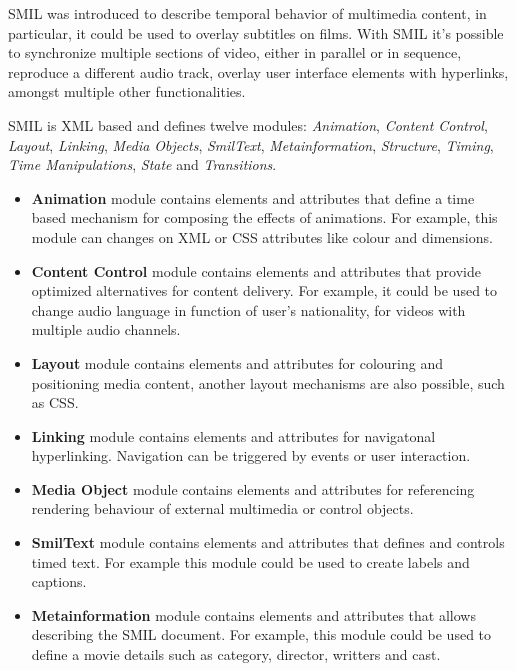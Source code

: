   \ac{SMIL}\cite{smil} was introduced to describe temporal behavior of multimedia content, in particular, it could be used to overlay subtitles on films. With \ac{SMIL} it's possible to synchronize multiple sections of video, either in parallel or in sequence, reproduce a different audio track, overlay user interface elements with hyperlinks, amongst multiple other functionalities.

  \ac{SMIL} is \ac{XML} based and defines twelve modules: \textit{Animation}, \textit{Content Control}, \textit{Layout}, \textit{Linking}, \textit{Media Objects}, \textit{SmilText}, \textit{Metainformation}, \textit{Structure}, \textit{Timing}, \textit{Time Manipulations}, \textit{State} and \textit{Transitions}.

\begin{itemize}

  \item \textbf{Animation} module contains elements and attributes that define a time based mechanism for composing the effects of animations. For example, this module can changes on \ac{XML} or \ac{CSS} attributes like colour and dimensions.  

  \item \textbf{Content Control} module contains elements and attributes that provide optimized alternatives for content delivery. For example, it could be used to change audio language in function of user's nationality, for videos with multiple audio channels.

  \item \textbf{Layout} module contains elements and attributes for colouring and positioning media content, another layout mechanisms are also possible, such as \ac{CSS}.

  \item \textbf{Linking} module contains elements and attributes for navigatonal hyperlinking. Navigation can be triggered by events or user interaction.

  \item \textbf{Media Object} module contains elements and attributes for referencing rendering behaviour of external multimedia or control objects.

  \item \textbf{SmilText} module contains elements and attributes that defines and controls timed text. For example this module could be used to create labels and captions.

  \item \textbf{Metainformation} module contains elements and attributes that allows describing the \ac{SMIL} document. For example, this module could be used to define a movie details such as category, director, writters and cast.


\end{itemize}

